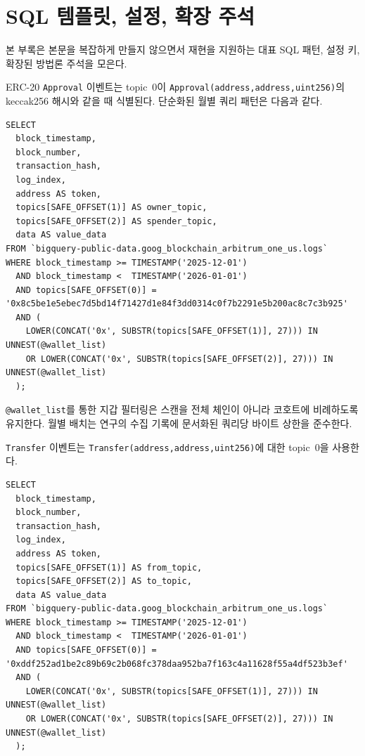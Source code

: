 \section{SQL 템플릿, 설정, 확장 주석}
\label{ch:appendix-sql}

본 부록은 본문을 복잡하게 만들지 않으면서 재현을 지원하는 대표 SQL 패턴, 설정 키, 확장된 방법론 주석을 모은다.


ERC-20 \texttt{Approval} 이벤트는 topic~$0$이 \texttt{Approval(address,address,uint256)}의 keccak256 해시와 같을 때 식별된다. 단순화된 월별 쿼리 패턴은 다음과 같다.

\begin{verbatim}
SELECT
  block_timestamp,
  block_number,
  transaction_hash,
  log_index,
  address AS token,
  topics[SAFE_OFFSET(1)] AS owner_topic,
  topics[SAFE_OFFSET(2)] AS spender_topic,
  data AS value_data
FROM `bigquery-public-data.goog_blockchain_arbitrum_one_us.logs`
WHERE block_timestamp >= TIMESTAMP('2025-12-01')
  AND block_timestamp <  TIMESTAMP('2026-01-01')
  AND topics[SAFE_OFFSET(0)] = '0x8c5be1e5ebec7d5bd14f71427d1e84f3dd0314c0f7b2291e5b200ac8c7c3b925'
  AND (
    LOWER(CONCAT('0x', SUBSTR(topics[SAFE_OFFSET(1)], 27))) IN UNNEST(@wallet_list)
    OR LOWER(CONCAT('0x', SUBSTR(topics[SAFE_OFFSET(2)], 27))) IN UNNEST(@wallet_list)
  );
\end{verbatim}

\texttt{@wallet\_list}를 통한 지갑 필터링은 스캔을 전체 체인이 아니라 코호트에 비례하도록 유지한다. 월별 배치는 연구의 수집 기록에 문서화된 쿼리당 바이트 상한을 준수한다.


\texttt{Transfer} 이벤트는 \texttt{Transfer(address,address,uint256)}에 대한 topic~$0$을 사용한다.

\begin{verbatim}
SELECT
  block_timestamp,
  block_number,
  transaction_hash,
  log_index,
  address AS token,
  topics[SAFE_OFFSET(1)] AS from_topic,
  topics[SAFE_OFFSET(2)] AS to_topic,
  data AS value_data
FROM `bigquery-public-data.goog_blockchain_arbitrum_one_us.logs`
WHERE block_timestamp >= TIMESTAMP('2025-12-01')
  AND block_timestamp <  TIMESTAMP('2026-01-01')
  AND topics[SAFE_OFFSET(0)] = '0xddf252ad1be2c89b69c2b068fc378daa952ba7f163c4a11628f55a4df523b3ef'
  AND (
    LOWER(CONCAT('0x', SUBSTR(topics[SAFE_OFFSET(1)], 27))) IN UNNEST(@wallet_list)
    OR LOWER(CONCAT('0x', SUBSTR(topics[SAFE_OFFSET(2)], 27))) IN UNNEST(@wallet_list)
  );
\end{verbatim}

